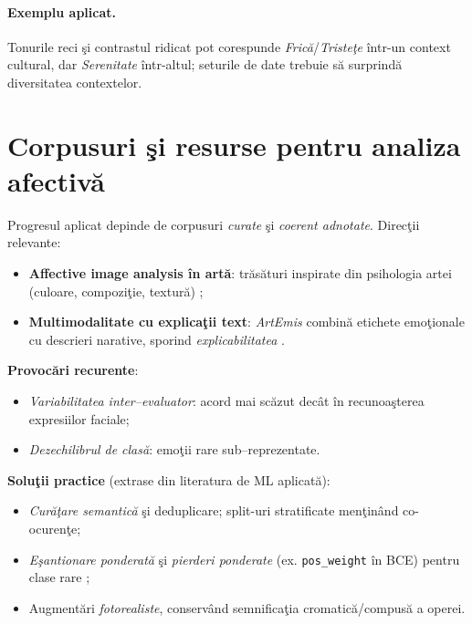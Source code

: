 \paragraph{Exemplu aplicat.} Tonurile reci şi contrastul ridicat pot corespunde \emph{Frică}/\emph{Tristeţe} într-un context cultural, dar \emph{Serenitate} într-altul; seturile de date trebuie să surprindă diversitatea contextelor.

\section{Corpusuri şi resurse pentru analiza afectivă}

Progresul aplicat depinde de corpusuri \emph{curate} şi \emph{coerent adnotate}. Direcţii relevante:
\begin{itemize}[leftmargin=*, itemsep=2pt, topsep=2pt]
  \item \textbf{Affective image analysis în artă}: trăsături inspirate din psihologia artei (culoare, compoziţie, textură) \cite{machajdik2010affective,yanulevskaya2012emotional};
  \item \textbf{Multimodalitate cu explicaţii text}: \emph{ArtEmis} combină etichete emoţionale cu descrieri narative, sporind \emph{explicabilitatea} \cite{achlioptas2021artemis}.
\end{itemize}

\noindent \textbf{Provocări recurente}:
\begin{itemize}[leftmargin=*, itemsep=2pt, topsep=2pt]
  \item \emph{Variabilitatea inter–evaluator}: acord mai scăzut decât în recunoaşterea expresiilor faciale;
  \item \emph{Dezechilibrul de clasă}: emoţii rare sub–reprezentate.
\end{itemize}

\noindent \textbf{Soluţii practice} (extrase din literatura de ML aplicată):
\begin{itemize}[leftmargin=*, itemsep=2pt, topsep=2pt]
  \item \emph{Curăţare semantică} şi deduplicare; split-uri stratificate menţinând co-ocurenţe;
  \item \emph{Eşantionare ponderată} şi \emph{pierderi ponderate} (ex. \texttt{pos\_weight} în BCE) pentru clase rare \cite{buda2018systematic};
  \item Augmentări \emph{fotorealiste}, conservând semnificaţia cromatică/compusă a operei.
\end{itemize}

